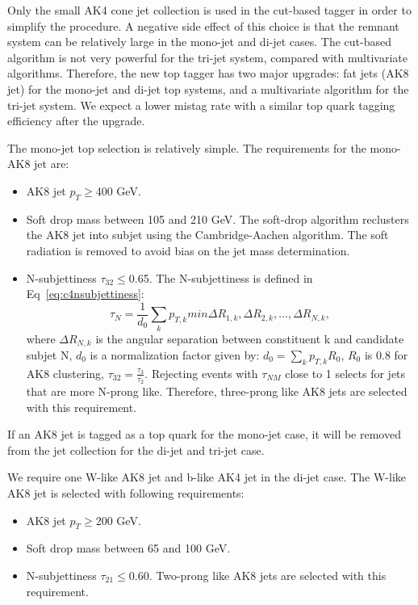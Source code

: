 Only the small AK4 cone jet collection is used in the cut-based tagger in order to simplify the procedure. A negative side effect of this choice is that the remnant system can be relatively large in the mono-jet and di-jet cases. The cut-based algorithm is not very powerful for the tri-jet system, compared with multivariate algorithms. Therefore, the new top tagger has two major upgrades: fat jets (AK8 jet) for the mono-jet and di-jet top systems, and a multivariate algorithm for the tri-jet system. We expect a lower mistag rate with a similar top quark tagging efficiency after the upgrade. 

The mono-jet top selection is relatively simple. The requirements for the mono-AK8 jet are:
\begin{itemize}
\item AK8 jet $p_{T}\ge$400 GeV.
\item Soft drop mass\cite{Larkoski:2014wba} between 105 and 210 GeV. The soft-drop algorithm reclusters the AK8 jet into subjet using the Cambridge-Aachen algorithm\cite{Dokshitzer:1997in}. The soft radiation is removed to avoid bias on the jet mass determination.
\item N-subjettiness $\tau_{32}\le$0.65. The N-subjettiness is defined in Eq~\ref{eq:c4nsubjettiness}:
\begin{equation}
 \tau_{N}=\frac{1}{d_{0}}\sum_{k} p_{T,k}min{\Delta R_{1,k},\Delta R_{2,k},...,\Delta R_{N,k}},
 \label{eq:c4nsubjettiness}
\end{equation}
where $\Delta R_{N,k}$ is the angular separation between constituent k and candidate subjet N, $d_{0}$ is a normalization factor given by: $d_{0}=\sum_{k}p_{T,k}R_{0}$, $R_{0}$ is 0.8 for AK8 clustering, $\tau_{32}=\frac{\tau_{3}}{\tau_{2}}$. Rejecting events with $\tau_{NM}$ close to 1 selects for jets that are more N-prong like\cite{Cohen:2012yc}. Therefore, three-prong like AK8 jets are selected with this requirement.
\end{itemize}

If an AK8 jet is tagged as a top quark for the mono-jet case, it will be removed from the jet collection for the di-jet and tri-jet case. 

We require one W-like AK8 jet and b-like AK4 jet in the di-jet case. The W-like AK8 jet is selected with following requirements:
\begin{itemize}
\item AK8 jet $p_{T}\ge$200 GeV.
\item Soft drop mass between 65 and 100 GeV.
\item N-subjettiness $\tau_{21}\le$0.60. Two-prong like AK8 jets are selected with this requirement.
\end{itemize}


